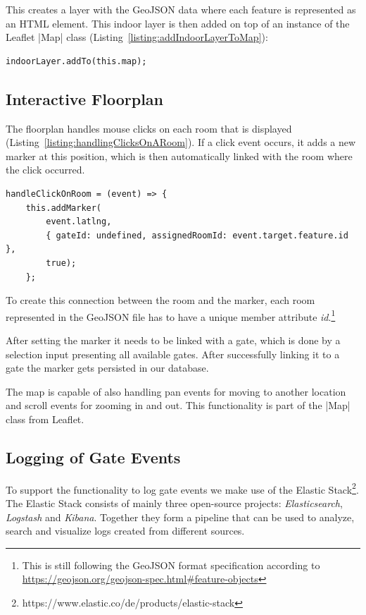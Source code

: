 This creates a layer with the GeoJSON data where each feature is represented as an HTML element.
This indoor layer is then added on top of an instance of the  Leaflet |Map|\cite{leaflet:map} class (Listing~\ref{listing:addIndoorLayerToMap}):

\begin{lstlisting}[label={listing:addIndoorLayerToMap},caption={Adding indoor layer to map}]
indoorLayer.addTo(this.map);
\end{lstlisting}


\subsection{Interactive Floorplan}
\label{Interactive Floorplan}

The floorplan handles mouse clicks on each room that is displayed (Listing~\ref{listing:handlingClicksOnARoom}). If a click event occurs, it adds a new marker at this position, which is then automatically linked with the room where the click occurred.

\begin{lstlisting}[label={listing:handlingClicksOnARoom},caption={Handling clicks on a room}]
handleClickOnRoom = (event) => {
    this.addMarker(
        event.latlng, 
        { gateId: undefined, assignedRoomId: event.target.feature.id }, 
        true);
    };
\end{lstlisting}

To create this connection between the room and the marker, each room represented in the GeoJSON file has to have a unique member attribute \emph{id}.\footnote{This is still following the GeoJSON format specification according to \url{https://geojson.org/geojson-spec.html\#feature-objects}}

After setting the marker it needs to be linked with a gate, which is done by a selection input presenting all available gates. After successfully linking it to a gate the marker gets persisted in our database.

The map is capable of also handling pan events for moving to another location and scroll events for zooming in and out. This functionality is part of the |Map| class from Leaflet.

\subsection{Logging of Gate Events}
\label{Logging of Gate Events}

To support the functionality to log gate events we make use of the Elastic Stack\footnote{https://www.elastic.co/de/products/elastic-stack}.
The Elastic Stack consists of mainly three open-source projects: \emph{Elasticsearch}, \emph{Logstash} and \emph{Kibana}.
Together they form a pipeline that can be used to analyze, search and visualize logs created from different sources. 

